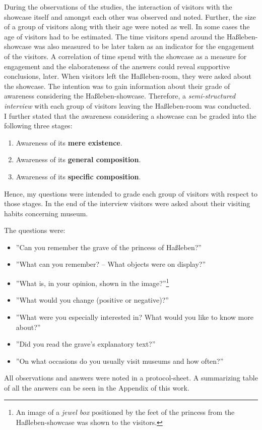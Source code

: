 During the observations of the studies, the interaction of visitors with the showcase itself and amongst each other was observed and noted. Further, the size of a group of visitors along with their age were noted as well. In some cases the age of visitors had to be estimated. The time visitors spend around the Haßleben-showcase was also measured to be later taken as an indicator for the engagement of the visitors. A correlation of time spend with the showcase as a measure for engagement and the elaborateness of the answers could reveal supportive conclusions, later. When visitors left the Haßleben-room, they were asked about the showcase. The intention was to gain information about their grade of awareness considering the Haßleben-showcase. Therefore, a \textit{semi-structured interview} with each group of visitors leaving the Haßleben-room was conducted.
\\
I further stated that the awareness considering a showcase can be graded into the following three stages:
\begin{enumerate}
	\item Awareness of its \textbf{mere existence}.
	\item Awareness of its \textbf{general composition}.
	\item Awareness of its \textbf{specific composition}.
\end{enumerate}  

Hence, my questions were intended to grade each group of visitors with respect to those stages. In the end of the interview visitors were asked about their visiting habits concerning museum. 

The questions were:
\begin{itemize}
	\item ''Can you remember the grave of the princess of Haßleben?''
	\item ''What can you remember? -- What objects were on display?''
	\item ''What is, in your opinion, shown in the image?''\footnote{An image of a \textit{jewel box} positioned by the feet of the princess from the Haßleben-showcase was shown to the visitors.}
	\item ''What would you change (positive or negative)?''
	\item ''What were you especially interested in? What would you like to know more about?''
	\item ''Did you read the grave's explanatory text?''
	\item ''On what occasions do you usually visit museums and how often?''
\end{itemize}
All observations and answers were noted in a protocol-sheet. A summarizing table of all the answers can be seen in the Appendix of this work. 

